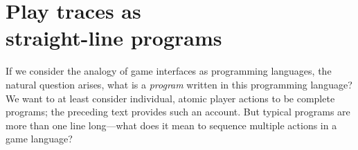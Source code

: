   \section{Play traces as \\ straight-line programs}
  \label{sec:traces}

  

    If we consider the analogy of game interfaces as programming languages,
    the natural question arises, what is a {\em program} written in this
    programming language? We want to at least consider individual, atomic
    player actions to be complete programs; the preceding text provides
    such an account. But typical programs are more than one line
    long---what does it mean to sequence multiple actions in a game
    language?

